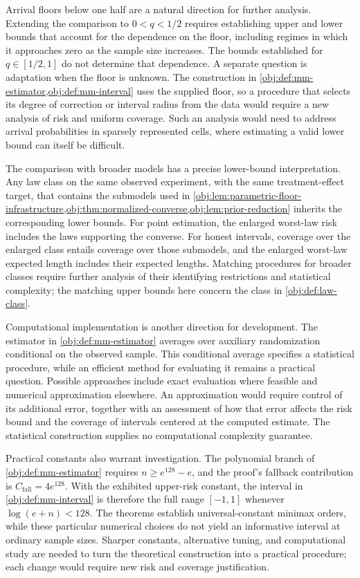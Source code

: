 \documentclass[11pt]{article}
\begin{document}
Arrival floors below one half are a natural direction for further analysis. Extending the comparison to \(0<q<1/2\) requires establishing upper and lower bounds that account for the dependence on the floor, including regimes in which it approaches zero as the sample size increases. The bounds established for \(q\in[1/2,1]\) do not determine that dependence. A separate question is adaptation when the floor is unknown. The construction in \cref{obj:def:mm-estimator,obj:def:mm-interval} uses the supplied floor, so a procedure that selects its degree of correction or interval radius from the data would require a new analysis of risk and uniform coverage. Such an analysis would need to address arrival probabilities in sparsely represented cells, where estimating a valid lower bound can itself be difficult.

The comparison with broader models has a precise lower-bound interpretation. Any law class on the same observed experiment, with the same treatment-effect target, that contains the submodels used in \cref{obj:lem:parametric-floor-infrastructure,obj:thm:normalized-converse,obj:lem:prior-reduction} inherits the corresponding lower bounds. For point estimation, the enlarged worst-law risk includes the laws supporting the converse. For honest intervals, coverage over the enlarged class entails coverage over those submodels, and the enlarged worst-law expected length includes their expected lengths. Matching procedures for broader classes require further analysis of their identifying restrictions and statistical complexity; the matching upper bounds here concern the class in \cref{obj:def:law-class}.

Computational implementation is another direction for development. The estimator in \cref{obj:def:mm-estimator} averages over auxiliary randomization conditional on the observed sample. This conditional average specifies a statistical procedure, while an efficient method for evaluating it remains a practical question. Possible approaches include exact evaluation where feasible and numerical approximation elsewhere. An approximation would require control of its additional error, together with an assessment of how that error affects the risk bound and the coverage of intervals centered at the computed estimate. The statistical construction supplies no computational complexity guarantee.

Practical constants also warrant investigation. The polynomial branch of \cref{obj:def:mm-estimator} requires \(n\ge e^{128}-e\), and the proof's fallback contribution is \(C_{\mathrm{fall}}=4e^{128}\). With the exhibited upper-risk constant, the interval in \cref{obj:def:mm-interval} is therefore the full range \([-1,1]\) whenever \(\log(e+n)<128\). The theorems establish universal-constant minimax orders, while these particular numerical choices do not yield an informative interval at ordinary sample sizes. Sharper constants, alternative tuning, and computational study are needed to turn the theoretical construction into a practical procedure; each change would require new risk and coverage justification.
\end{document}
